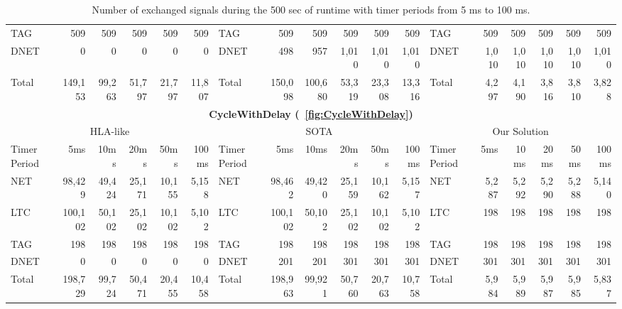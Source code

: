 \begin{table*}
\begin{tabular}{|l|rrrrr||l|rrrrr||l|rrrrr|}
		TAG & 509 & 509 & 509 & 509 & 509 & TAG & 509 & 509 & 509 & 509 & 509 & TAG & 509 & 509 & 509 & 509 & 509 \\
		DNET & 0 & 0 & 0 & 0 & 0 & DNET & 498 & 957 & 1,010 & 1,010 & 1,010 & DNET & 1,010 & 1,010 & 1,010 & 1,010 & 1,010 \\
		\hline
		Total & 149,153 & 99,263 & 51,797 & 21,797 & 11,807 & Total & 150,098 & 100,680 & 53,319 & 23,308 & 13,316 & Total & 4,297 & 4,190 & 3,816 & 3,810 & 3,828 \\
		\hline
%
		\hline
		\hline
		\multicolumn{18}{|c|}{\textbf{CycleWithDelay (\figurename~\ref{fig:CycleWithDelay})}} \\
		\hline
		\multicolumn{6}{|c||}{HLA-like} & \multicolumn{6}{|c||}{SOTA} & \multicolumn{6}{|c|}{Our Solution} \\
		\hline
		Timer Period \hspace{-5pt} & 5ms & 10ms & 20ms & 50ms & 100ms & Timer Period \hspace{-5pt} & 5ms & 10ms & 20ms & 50ms & 100ms & Timer Period \hspace{-5pt} & 5ms & 10ms & 20ms & 50ms & 100ms \\
		\hline
		NET & 98,429 & 49,424 & 25,171 & 10,155 & 5,158 & NET & 98,462 & 49,420 & 25,159 & 10,162 & 5,157 & NET & 5,287 & 5,292 & 5,290 & 5,288 & 5,140 \\
		LTC & 100,102 & 50,102 & 25,102 & 10,102 & 5,102 & LTC & 100,102 & 50,102 & 25,102 & 10,102 & 5,102 & LTC & 198 & 198 & 198 & 198 & 198 \\
		TAG & 198 & 198 & 198 & 198 & 198 & TAG & 198 & 198 & 198 & 198 & 198 & TAG & 198 & 198 & 198 & 198 & 198 \\
		DNET & 0 & 0 & 0 & 0 & 0 & DNET & 201 & 201 & 301 & 301 & 301 & DNET & 301 & 301 & 301 & 301 & 301 \\
		\hline
		Total & 198,729 & 99,724 & 50,471 & 20,455 & 10,458 & Total & 198,963 & 99,921 & 50,760 & 20,763 & 10,758 & Total & 5,984 & 5,989 & 5,987 & 5,985 & 5,837 \\
		\hline
	\end{tabular}
	
	\caption{Number of exchanged signals during the 500 sec of runtime with timer periods from 5 ms to 100 ms.}
	\label{tab:NumSignals}
\end{table*}